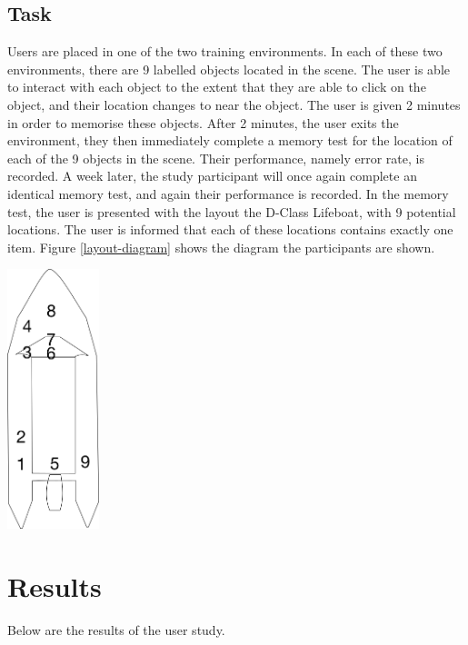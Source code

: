 \documentclass[ %
                    author={Elis Jones},
                supervisor={Dr. Kirsten Cater},
                    degree={BSc},
                     title={The Effect of Presentation Medium on Spatial Cognition},
                  subtitle={in the Virtual Environment},
                      year={2018} ]{dissertation}
\begin{document}
\subsection{Task}
Users are placed in one of the two training environments. In each of these two environments, there are 9 labelled objects located in the scene. The user is able to interact with each object to the extent that they are able to click on the object, and their location changes to near the object. The user is given 2 minutes in order to memorise these objects. After 2 minutes, the user exits the environment, they then immediately complete a memory test for the location of each of the 9 objects in the scene. Their performance, namely error rate, is recorded. A week later, the study participant will once again complete an identical memory test, and again their performance is recorded. In the memory test, the user is presented with the layout the D-Class Lifeboat, with 9 potential locations. The user is informed that each of these locations contains exactly one item. Figure \ref{layout-diagram} shows the diagram the participants are shown. 

\begin{minipage}{\textwidth}
\hfill \break
\centering
\includegraphics[width=0.2\textwidth]{images/ilb_simple}
\label{layout-diagram}
\hfill \break
\end{minipage}
\newpage
\section{Results}
Below are the results of the user study. 
\end{document}
